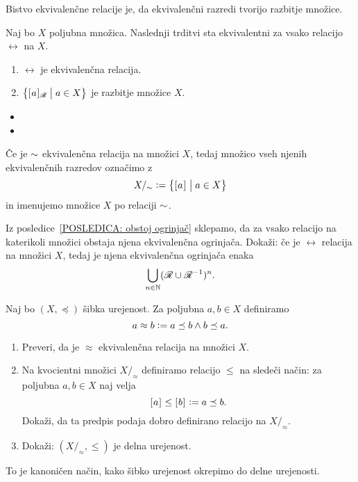 		Bistvo ekvivalenčne relacije je, da ekvivalenčni razredi tvorijo razbitje množice.
		
		
		
		\begin{izrek}
			Naj bo $X$ poljubna množica. Naslednji trditvi sta ekvivalentni za vsako relacijo $\rel$ na $X$.
			\begin{enumerate}
				\item
					$\rel$ je ekvivalenčna relacija.
				\item
					$\set[1]{\ec[\rel]{a}}{a \in X}$ je razbitje množice $X$.
			\end{enumerate}
		\end{izrek}
		
		\begin{dokaz}
			\begin{itemize}
				\item{}
				\item{}
			\end{itemize}
		\end{dokaz}
		
		Če je $\sim$ ekvivalenčna relacija na množici $X$, tedaj množico vseh njenih ekvivalenčnih razredov označimo z
		\[X/_\equ \dfeq \set[1]{\ec{a}}{a \in X}\]
		in imenujemo  množice $X$ po relaciji $\sim$.
		
		
		\begin{vaja}
			Iz posledice~\ref{POSLEDICA: obstoj ogrinjač} sklepamo, da za vsako relacijo na katerikoli množici obstaja njena ekvivalenčna ogrinjača. Dokaži: če je $\rel$ relacija na množici $X$, tedaj je njena ekvivalenčna ogrinjača enaka
			\[\bigcup_{n \in \NN} (\rel \cup \rel^{-1})^n.\]
		\end{vaja}
		
		\begin{vaja}
			Naj bo $(X, \preceq)$ šibka urejenost. Za poljubna $a, b \in X$ definiramo
			\[a \approx b \mathrel{\mathop:}= a \preceq b \land b \preceq a.\]
			\begin{enumerate}
				\item
					Preveri, da je $\approx$ ekvivalenčna relacija na množici $X$.
				\item
					Na kvocientni množici $X/_\approx$ definiramo relacijo $\leq$ na sledeči način: za poljubna $a, b \in X$ naj velja
					\[[\:\!{a}\:\!]_{} \leq [\:\!{b}\:\!]_{} \mathrel{\mathop:}= a \preceq b.\]
					Dokaži, da ta predpis podaja dobro definirano relacijo na $X/_\approx$.
				\item
					Dokaži: $(X/_\approx, \leq)$ je delna urejenost.
			\end{enumerate}
			To je kanoničen način, kako šibko urejenost okrepimo do delne urejenosti.
		\end{vaja}
		
